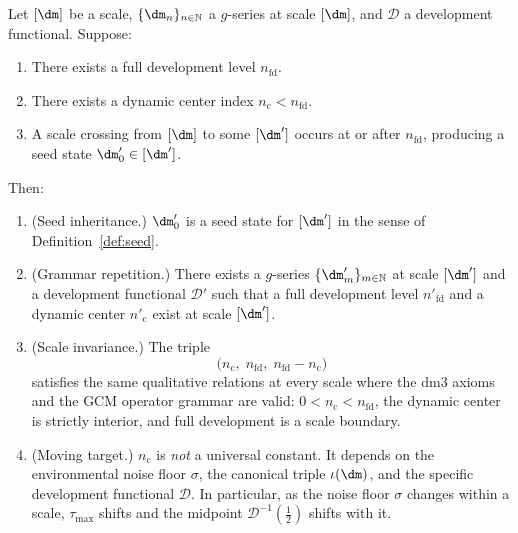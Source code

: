\begin{theorem}
\label{thm:g6invariant}
Let $[\dm]$ be a scale, $\{\dm_n\}_{n \in \mathbb{N}}$ a $g$-series
at scale $[\dm]$, and $\mathcal{D}$ a development functional.
Suppose:
\begin{enumerate}[label=(\arabic*)]
  \item There exists a full development level $n_{\mathrm{fd}}$.
  \item There exists a dynamic center index $n_{\mathrm{c}} < n_{\mathrm{fd}}$.
  \item A scale crossing from $[\dm]$ to some $[\dm']$ occurs at or
    after $n_{\mathrm{fd}}$, producing a seed state $\dm'_0 \in [\dm']$.
\end{enumerate}
Then:
\begin{enumerate}[label=(\roman*)]
  \item \textup{(Seed inheritance.)} $\dm'_0$ is a seed state for
    $[\dm']$ in the sense of Definition~\ref{def:seed}.
  \item \textup{(Grammar repetition.)} There exists a $g$-series
    $\{\dm'_m\}_{m \in \mathbb{N}}$ at scale $[\dm']$ and a
    development functional $\mathcal{D}'$ such that a full
    development level $n'_{\mathrm{fd}}$ and a dynamic center
    $n'_{\mathrm{c}}$ exist at scale $[\dm']$.
  \item \textup{(Scale invariance.)} The triple
    \[
      \bigl(n_{\mathrm{c}},\; n_{\mathrm{fd}},\;
      n_{\mathrm{fd}} - n_{\mathrm{c}}\bigr)
    \]
    satisfies the same qualitative relations at every scale where
    the dm3 axioms and the GCM operator grammar are valid:
    $0 < n_{\mathrm{c}} < n_{\mathrm{fd}}$, the dynamic center
    is strictly interior, and full development is a scale boundary.
  \item \textup{(Moving target.)} $n_{\mathrm{c}}$ is
    \emph{not} a universal constant. It depends on the environmental
    noise floor $\sigma$, the canonical triple $\iota(\dm)$, and the
    specific development functional $\mathcal{D}$. In particular, as
    the noise floor $\sigma$ changes within a scale, $\tau_{\max}$
    shifts and the midpoint $\mathcal{D}^{-1}(\tfrac{1}{2})$ shifts
    with it.
\end{enumerate}
\end{theorem}

